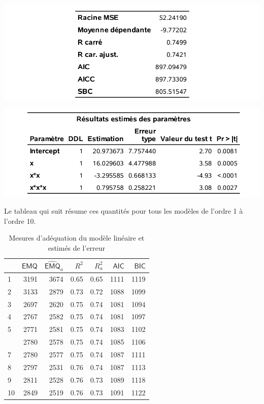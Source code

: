 \documentclass[
  11pt,
  letterpaper,
]{book}
\theoremstyle{definition}
\theoremstyle{definition}
\theoremstyle{definition}
\theoremstyle{remark}
\begin{document}
\begin{center}\includegraphics[width=0.7\linewidth]{figures/02-select-e1} \end{center}

\begin{center}\includegraphics[width=0.7\linewidth]{figures/02-select-e2} \end{center}

Le tableau qui suit résume ces quantités pour tous les modèles de l'ordre 1 à l'ordre 10.

\begin{table}

\caption{\label{tab:02-table1}Mesures d'adéquation du modèle linéaire et estimés de l'erreur}
\centering
\begin{tabular}[t]{lrrrrrr}
\toprule
  & \(\mathsf{EMQ}\) & \(\widehat{\mathsf{EMQ}}_a\) & \(R^2\) & \(R^2_a\) & \(\mathsf{AIC}\) & \(\mathsf{BIC}\)\\
\midrule
1 & 3191 & 3674 & 0.65 & 0.65 & 1111 & 1119\\
2 & 3133 & 2879 & 0.73 & 0.72 & 1088 & 1099\\
3 & 2697 & 2620 & 0.75 & 0.74 & 1081 & 1094\\
4 & 2767 & 2582 & 0.75 & 0.74 & 1081 & 1097\\
5 & 2771 & 2581 & 0.75 & 0.74 & 1083 & 1102\\
\addlinespace
6 & 2780 & 2578 & 0.75 & 0.74 & 1085 & 1106\\
7 & 2780 & 2577 & 0.75 & 0.74 & 1087 & 1111\\
8 & 2797 & 2531 & 0.76 & 0.74 & 1087 & 1113\\
9 & 2811 & 2528 & 0.76 & 0.73 & 1089 & 1118\\
10 & 2849 & 2519 & 0.76 & 0.73 & 1091 & 1122\\
\bottomrule
\end{tabular}
\end{table}
\end{document}
